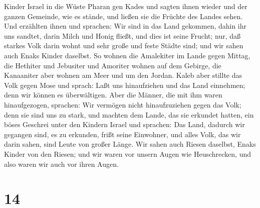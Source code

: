 Kinder Israel in die Wüste Pharan gen Kades und sagten ihnen wieder und
der ganzen Gemeinde, wie es stände, und ließen sie die Früchte des
Landes sehen.  Und erzählten ihnen und sprachen: Wir sind
in das Land gekommen, dahin ihr uns sandtet, darin Milch und Honig
fließt, und dies ist seine Frucht;  nur, daß starkes Volk
darin wohnt und sehr große und feste Städte sind; und wir sahen auch
Enaks Kinder daselbst.  So wohnen die Amalekiter im Lande
gegen Mittag, die Hethiter und Jebusiter und Amoriter wohnen auf dem
Gebirge, die Kanaaniter aber wohnen am Meer und um den Jordan.
 Kaleb aber stillte das Volk gegen Mose und sprach: Laßt
uns hinaufziehen und das Land einnehmen; denn wir können es
überwältigen.  Aber die Männer, die mit ihm waren
hinaufgezogen, sprachen: Wir vermögen nicht hinaufzuziehen gegen das
Volk; denn sie sind uns zu stark,  und machten dem Lande,
das sie erkundet hatten, ein böses Geschrei unter den Kindern Israel und
sprachen: Das Land, dadurch wir gegangen sind, es zu erkunden, frißt
seine Einwohner, und alles Volk, das wir darin sahen, sind Leute von
großer Länge.  Wir sahen auch Riesen daselbst, Enaks Kinder
von den Riesen; und wir waren vor unsern Augen wie Heuschrecken, und
also waren wir auch vor ihren Augen.

\hypertarget{section-13}{%
\section{14}\label{section-13}}

